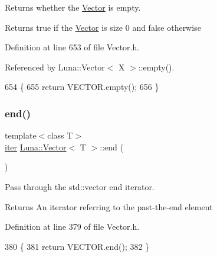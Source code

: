 Returns whether the \hyperlink{classLuna_1_1Vector}{Vector} is empty. 

\begin{DoxyReturn}{Returns}
true if the \hyperlink{classLuna_1_1Vector}{Vector} is size 0 and false otherwise 
\end{DoxyReturn}


Definition at line 653 of file Vector.\+h.



Referenced by Luna\+::\+Vector$<$ X $>$\+::empty().


\begin{DoxyCode}
654   \{
655     \textcolor{keywordflow}{return} VECTOR.empty();
656   \}
\end{DoxyCode}
\mbox{\label{classLuna_1_1Vector_a94f0c4fd25cb841b21d7bf7be4d6004f}} 
\subsubsection{\texorpdfstring{end()}{end()}\hspace{0.1cm}{\footnotesize\ttfamily [1/2]}}
{\footnotesize\ttfamily template$<$class T$>$ \\
\hyperlink{classLuna_1_1Vector_aa6c4164f0cd114da31acfde53a36d65e}{iter} \hyperlink{classLuna_1_1Vector}{Luna\+::\+Vector}$<$ T $>$\+::end (\begin{DoxyParamCaption}{ }\end{DoxyParamCaption})\hspace{0.3cm}{\ttfamily [inline]}}



Pass through the std\+::vector end iterator. 

\begin{DoxyReturn}{Returns}
An iterator referring to the past-\/the-\/end element 
\end{DoxyReturn}


Definition at line 379 of file Vector.\+h.


\begin{DoxyCode}
380     \{
381       \textcolor{keywordflow}{return} VECTOR.end();
382     \}
\end{DoxyCode}
\mbox{\label{classLuna_1_1Vector_aeb718e0c6a0d8cc3687481d544867f95}} 

